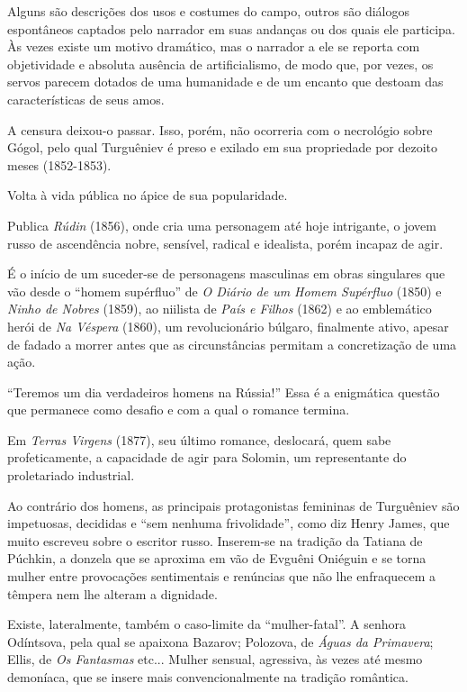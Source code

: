 Alguns são descrições dos usos e costumes do campo, outros são diálogos
espontâneos captados pelo narrador em suas andanças ou dos quais ele
participa. Às vezes existe um motivo dramático, mas o narrador a ele se
reporta com objetividade e absoluta ausência de artificialismo, de modo
que, por vezes, os servos parecem dotados de uma humanidade e de um
encanto que destoam das características de seus amos.

A censura deixou-o passar. Isso, porém, não ocorreria com o necrológio
sobre Gógol, pelo qual Turguêniev é preso e exilado em sua propriedade
por dezoito meses (1852-1853).

Volta à vida pública no ápice de sua popularidade.

Publica \emph{Rúdin} (1856), onde cria uma personagem até hoje
intrigante, o jovem russo de ascendência nobre, sensível, radical e
idealista, porém incapaz de agir.

É o início de um suceder-se de personagens masculinas em obras
singulares que vão desde o ``homem supérfluo'' de \emph{O Diário de um
Homem Supérfluo} (1850) e \emph{Ninho de Nobres} (1859), ao niilista de
\emph{País e Filhos} (1862) e ao emblemático herói de \emph{Na Véspera}
(1860), um revolucionário búlgaro, finalmente ativo, apesar de fadado a
morrer antes que as circunstâncias permitam a concretização de uma ação.

``Teremos um dia verdadeiros homens na Rússia!'' Essa é a enigmática
questão que permanece como desafio e com a qual o romance termina.

Em \emph{Terras Virgens} (1877), seu último romance, deslocará, quem
sabe profeticamente, a capacidade de agir para Solomin, um representante
do proletariado industrial.

Ao contrário dos homens, as principais protagonistas femininas de
Turguêniev são impetuosas, decididas e ``sem nenhuma frivolidade'', como
diz Henry James, que muito escreveu sobre o escritor russo. Inserem-se
na tradição da Tatiana de Púchkin, a donzela que se aproxima em vão de
Evguêni Oniéguin e se torna mulher entre provocações sentimentais e
renúncias que não lhe enfraquecem a têmpera nem lhe alteram a dignidade.

Existe, lateralmente, também o caso-limite da ``mulher-fatal''. A
senhora Odíntsova, pela qual se apaixona Bazarov; Polozova, de
\emph{Águas da Primavera}; Ellis, de \emph{Os Fantasmas} etc... Mulher
sensual, agressiva, às vezes até mesmo demoníaca, que se insere mais
convencionalmente na tradição romântica.

